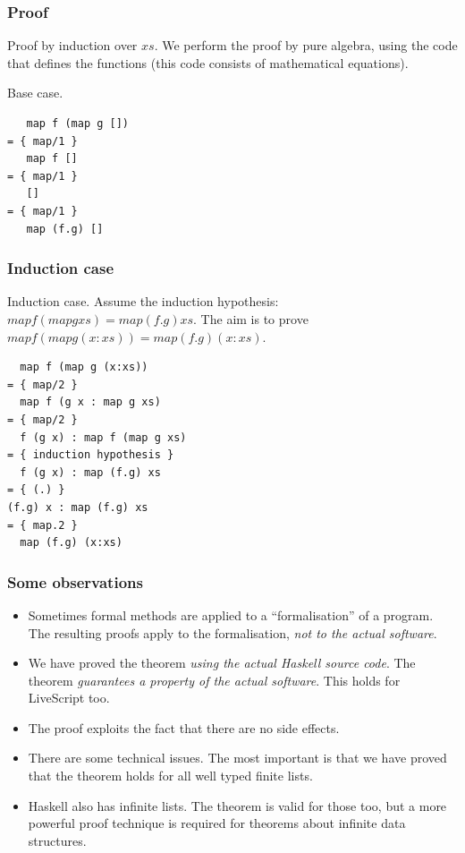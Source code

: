\documentclass{beamer}
\begin{document}
\begin{frame}[fragile]
\frametitle{Proof}

Proof by induction over $xs$.  We perform the proof by pure
algebra, using the code that defines the functions (this code
consists of mathematical equations).

Base case.

\begin{verbatim}
   map f (map g [])
= { map/1 }
   map f []
= { map/1 }
   []
= { map/1 }
   map (f.g) []
\end{verbatim}

\end{frame}

\begin{frame}[fragile]
\frametitle{Induction case}

Induction case.  Assume the induction hypothesis: $map f (map g xs)
= map (f.g) xs$.  The aim is to prove $map f (map g (x:xs)) = map
(f.g) (x:xs)$.

\begin{verbatim}
  map f (map g (x:xs))
= { map/2 }
  map f (g x : map g xs)
= { map/2 }
  f (g x) : map f (map g xs)
= { induction hypothesis }
  f (g x) : map (f.g) xs
= { (.) }
(f.g) x : map (f.g) xs
= { map.2 }
  map (f.g) (x:xs)
\end{verbatim}

\end{frame}

\begin{frame}[fragile]
\frametitle{Some observations}

\begin{itemize}
\item Sometimes formal methods are applied to a ``formalisation''
  of a program.  The resulting proofs apply to the formalisation,
  \emph{not to the actual software}.
\item We have proved the theorem \emph{using the actual Haskell
    source code}.  The theorem \emph{guarantees a property of the
    actual software}. This holds for LiveScript too.
\item The proof exploits the fact that there are no side effects.
\item There are some technical issues.  The most important is that
  we have proved that the theorem holds for all well typed finite
  lists.
\item Haskell also has infinite lists.  The theorem is valid for
  those too, but a more powerful proof technique is required for
  theorems about infinite data structures.
\end{itemize}

\end{frame}
\end{document}
